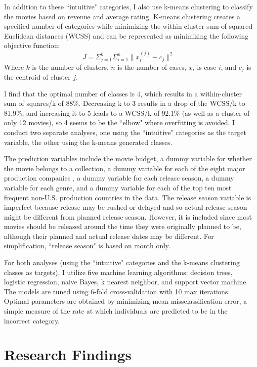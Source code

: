 \documentclass[12pt,english]{article}
\begin{document}
In addition to these ``intuitive" categories, I also use k-means clustering to classify the  movies based on revenue and average rating. K-means clustering creates a specified number of categories while minimizing the within-cluster sum of squared Euclidean distances (WCSS) and can be represented as minimizing the following objective function: 
\begin{equation}
    J=\Sigma^k_{j=1}\Sigma^n_{i=1}\|  x_i^{(j)}-c_j \|^2
\end{equation}
Where $k$ is the number of clusters, $n$ is the number of cases, $x_i$ is case $i$, and $c_j$ is the centroid of cluster $j$.

I find that the optimal number of classes is 4, which results in a within-cluster sum of squares/k of 88\%. Decreasing k to 3 results in a drop of the WCSS/k to 81.9\%, and increasing it to 5 leads to a WCSS/k of 92.1\% (as well as a cluster of only 12 movies), so 4 seems to be the ``elbow" where overfitting is avoided. I conduct two separate analyses, one using the ``intuitive" categories as the target variable, the other using the k-means generated classes.

The prediction variables include the movie budget, a dummy variable for whether the movie belongs to a collection, a dummy variable for each of the eight major production companies \citep{ferriani}, a dummy variable for each release season, a dummy variable for each genre, and a dummy variable for each of the top ten most frequent non-U.S. production countries in the data. The release season variable is imperfect because release may be rushed or delayed and so actual release season might be different from planned release season. However, it is included since most movies should be released around the time they were originally planned to be, although their planned and actual release dates may be different. For simplification, ``release season" is based on month only.

For both analyses (using the ``intuitive" categories and the k-means clustering classes as targets), I utilize five machine learning algorithms: decision trees, logistic regression, naive Bayes, k nearest neighbor, and support vector machine. The models are tuned using 6-fold cross-validation with 10 max iterations. Optimal parameters are obtained by minimizing mean missclassification error, a simple measure of the rate at which individuals are predicted to be in the incorrect category.


\section{Research Findings}
\end{document}
